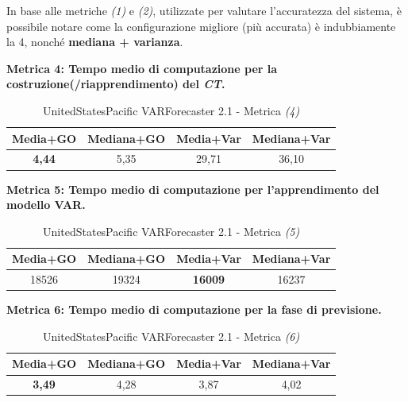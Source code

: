 \documentclass[12pt,a4paper,oneside,openright]{book}
\begin{document}
\medskip

In base alle metriche \textit{(1)} e \textit{(2)}, utilizzate per valutare l'accuratezza del sistema, è possibile notare come la configurazione migliore (più accurata) è indubbiamente la 4, nonché \textbf{mediana + varianza}.

\medskip

\textbf{Metrica 4: Tempo medio di computazione per la costruzione(/riapprendimento) del \textit{CT}.}

\medskip


\begin{table}[H]
\centering
\begin{tabular}[H]{|c|c|c|c|}
\hline
\textbf{Media+GO} & \textbf{Mediana+GO} & \textbf{Media+Var} & \textbf{Mediana+Var} \\
\hline
\textbf{4,44} & 5,35 & 29,71 & 36,10 \\
\hline
\end{tabular}
\caption{UnitedStatesPacific VARForecaster 2.1 - Metrica \textit{(4)}}
\end{table} 

\medskip 
\textbf{Metrica 5: Tempo medio di computazione per l'apprendimento del modello VAR.}

\medskip

\begin{table}[H]
\centering
\begin{tabular}[H]{|c|c|c|c|}
\hline
\textbf{Media+GO} & \textbf{Mediana+GO} & \textbf{Media+Var} & \textbf{Mediana+Var} \\
\hline
18526 & 19324 & \textbf{16009} & 16237\\
\hline
\end{tabular}
\caption{UnitedStatesPacific VARForecaster 2.1 - Metrica \textit{(5)}}
\end{table} 

\medskip 
\textbf{Metrica 6: Tempo medio di computazione per la fase di previsione.}

\medskip


\begin{table}[H]
\centering
\begin{tabular}[H]{|c|c|c|c|}
\hline
\textbf{Media+GO} & \textbf{Mediana+GO} & \textbf{Media+Var} & \textbf{Mediana+Var} \\
\hline
\textbf{3,49} & 4,28 & 3,87 & 4,02 \\
\hline
\end{tabular}
\caption{UnitedStatesPacific VARForecaster 2.1 - Metrica \textit{(6)}}
\end{table} 
\end{document}
